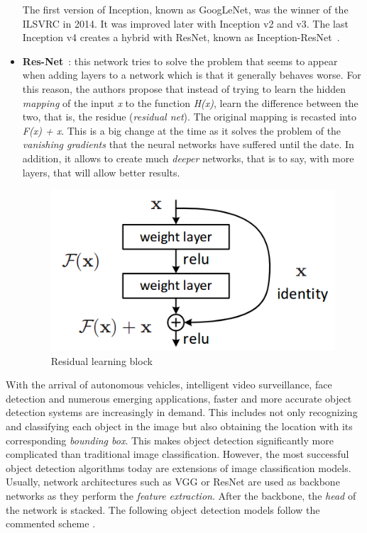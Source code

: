 \begin{itemize}
The first version of Inception, known as GoogLeNet, was the winner of the ILSVRC in 2014. It was improved later with Inception v2 and v3. The last Inception v4 creates a hybrid with ResNet, known as Inception-ResNet~\cite{szegedy2017inception}.
\item \textbf{Res-Net}~\cite{he2016deep}: this network tries to solve the problem that seems to appear when adding layers to a network which is that it generally behaves worse. For this reason, the authors propose that instead of trying to learn the hidden \textit{mapping} of the input \textit{x} to the function \textit{H(x)}, learn the difference between the two, that is, the residue (\textit{residual net}). The original mapping is recasted into \textit{F(x) + x}. This is a big change at the time as it solves the problem of the \textit{vanishing gradients} that the neural networks have suffered until the date. In addition, it allows to create much \textit{deeper} networks, that is to say, with more layers, that will allow better results.
\begin{figure}[H]
\begin{center}
\includegraphics[scale=0.35]{figures/resnet.png}
\caption{Residual learning block \cite{he2016deep}}
\label{fig:resnet}
\end{center}
\end{figure}
\end{itemize}
With the arrival of autonomous vehicles, intelligent video surveillance, face detection and numerous emerging applications, faster and more accurate object detection systems are increasingly in demand. This includes not only recognizing and classifying each object in the image but also obtaining the location with its corresponding \textit{bounding box}. This makes object detection significantly more complicated than traditional image classification. However, the most successful object detection algorithms today are extensions of image classification models. Usually, network architectures such as VGG or ResNet are used as backbone networks as they perform the \textit{feature extraction}. After the backbone, the \textit{head} of the network is stacked. The following object detection models follow the commented scheme \cite{fu2017dssd}.\\
